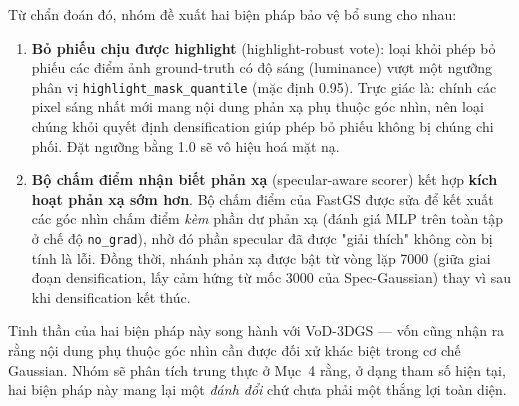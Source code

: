     Từ chẩn đoán đó, nhóm đề xuất hai biện pháp bảo vệ bổ sung cho nhau:
    \begin{enumerate}
        \item \textbf{Bỏ phiếu chịu được highlight} (highlight-robust vote): loại
        khỏi phép bỏ phiếu các điểm ảnh ground-truth có độ sáng (luminance) vượt một
        ngưỡng phân vị \texttt{highlight\_mask\_quantile} (mặc định 0.95). Trực giác
        là: chính các pixel sáng nhất mới mang nội dung phản xạ phụ thuộc góc nhìn,
        nên loại chúng khỏi quyết định densification giúp phép bỏ phiếu không bị
        chúng chi phối. Đặt ngưỡng bằng 1.0 sẽ vô hiệu hoá mặt nạ.
        \item \textbf{Bộ chấm điểm nhận biết phản xạ} (specular-aware scorer) kết
        hợp \textbf{kích hoạt phản xạ sớm hơn}. Bộ chấm điểm của FastGS được sửa để
        kết xuất các góc nhìn chấm điểm \textit{kèm} phần dư phản xạ (đánh giá MLP
        trên toàn tập ở chế độ \texttt{no\_grad}), nhờ đó phần specular đã được
        "giải thích" không còn bị tính là lỗi. Đồng thời, nhánh phản xạ được bật từ
        vòng lặp 7000 (giữa giai đoạn densification, lấy cảm hứng từ mốc 3000 của
        Spec-Gaussian) thay vì sau khi densification kết thúc.
    \end{enumerate}
    Tinh thần của hai biện pháp này song hành với VoD-3DGS \cite{vod3dgs} — vốn cũng
    nhận ra rằng nội dung phụ thuộc góc nhìn cần được đối xử khác biệt trong cơ chế
    Gaussian. Nhóm sẽ phân tích trung thực ở Mục~4 rằng, ở dạng tham số hiện tại,
    hai biện pháp này mang lại một \textit{đánh đổi} chứ chưa phải một thắng lợi
    toàn diện.

